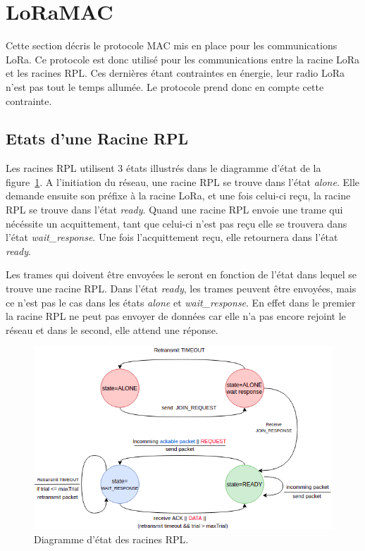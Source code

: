 \section{LoRaMAC}\label{sec:archi-loramac:proto}
\renewcommand{\rightmark}{LoRaMac}

    Cette section décris le protocole MAC mis en place pour les communications LoRa. Ce protocole est donc utilisé pour les communications entre la racine LoRa et les racines RPL. Ces dernières étant contraintes en énergie, leur radio LoRa n'est pas tout le temps allumée. Le protocole prend donc en compte cette contrainte.

\subsection{Etats d'une Racine RPL}
    Les racines RPL utilisent 3 états illustrés dans le diagramme d'état de la figure~\ref{fig:archi-state}. A l'initiation du réseau, une racine RPL se trouve dans l'état \textit{alone}. Elle demande ensuite son préfixe à la racine LoRa, et une fois celui-ci reçu, la racine RPL se trouve dans l'état \textit{ready}. Quand une racine RPL envoie une trame qui nécéssite un acquittement, tant que celui-ci n'est pas reçu elle se trouvera dans l'état \textit{wait\_response}. Une fois l'acquittement reçu, elle retournera dans l'état \textit{ready}.
    
    Les trames qui doivent être envoyées le seront en fonction de l'état dans lequel se trouve une racine RPL. Dans l'état \textit{ready}, les trames peuvent être envoyées, mais ce n'est pas le cas dans les états \textit{alone} et \textit{wait\_response}. En effet dans le premier la racine RPL ne peut pas envoyer de données car elle n'a pas encore rejoint le réseau et dans le second, elle attend une réponse.
    \begin{figure}[H]
        \centering
        \includegraphics[scale=0.5]{res/pictures/loramac-state.drawio.png}
        \caption{Diagramme d'état des racines RPL.}
        \label{fig:archi-state}
    \end{figure}

